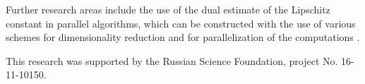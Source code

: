 \documentclass[twocolumn]{svjour3}          %
\begin{document}
	Further research areas include the use of the dual estimate of the Lipschitz constant in parallel algorithms, which can be constructed with the use of various schemes for  dimensionality reduction and  for parallelization of the computations \cite{Strongin2018}.



\begin{acknowledgements}
This research was supported by the Russian Science Foundation, project No. 16-11-10150.
\end{acknowledgements}



\end{document}
